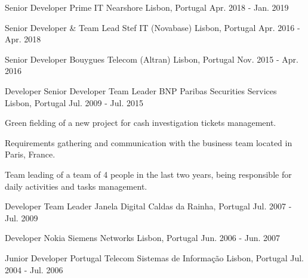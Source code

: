 \begin{cventries}
{\begin{cvitems}
      \end{cvitems}
    }

  \cventry
    {Senior Developer} %
    {Prime IT Nearshore} %
    {Lisbon, Portugal} %
    {Apr. 2018 - Jan. 2019} %
    {
    }

  \cventry
    {Senior Developer \& Team Lead} %
    {Stef IT (Novabase)} %
    {Lisbon, Portugal} %
    {Apr. 2016 - Apr. 2018} %
    {
    }

  \cventry
    {Senior Developer} %
    {Bouygues Telecom (Altran)} %
    {Lisbon, Portugal} %
    {Nov. 2015 - Apr. 2016} %
    {
    }

  \cventry
    {Developer \> Senior Developer \> Team Leader} %
    {BNP Paribas Securities Services} %
    {Lisbon, Portugal} %
    {Jul. 2009 - Jul. 2015} %
    {
      \begin{cvitems} %
        \item Green fielding of a new project for cash investigation tickets management.
        \item Requirements gathering and communication with the business team located in Paris, France.
        \item Team leading of a team of 4 people in the last two years, being responsible for daily activities and tasks management.

      \end{cvitems}
    }

  \cventry
    {Developer \> Team Leader} %
    {Janela Digital} %
    {Caldas da Rainha, Portugal} %
    {Jul. 2007 - Jul. 2009} %
    {
    }

  \cventry
    {Developer} %
    {Nokia Siemens Networks} %
    {Lisbon, Portugal} %
    {Jun. 2006 - Jun. 2007} %
    {
    }

  \cventry
    {Junior Developer} %
    {Portugal Telecom Sistemas de Informação} %
    {Lisbon, Portugal} %
    {Jul. 2004 - Jul. 2006} %
    {
    }

\end{cventries}
